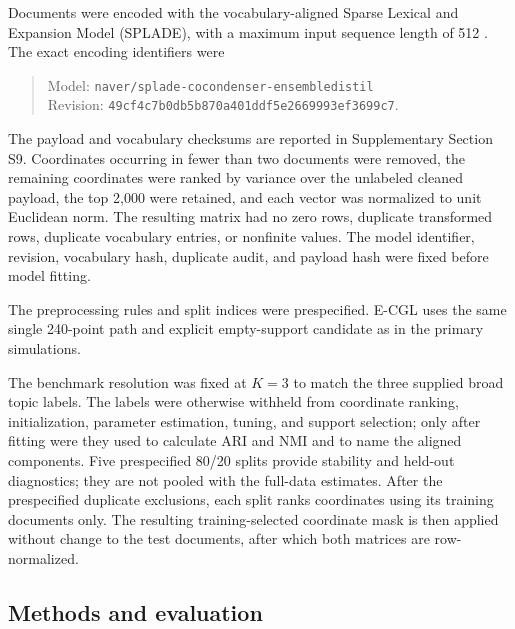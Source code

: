 \documentclass[preprint,12pt,authoryear]{elsarticle}
\begin{document}
Documents were encoded with the vocabulary-aligned Sparse Lexical and
Expansion Model (SPLADE), with a maximum input sequence length of 512
\citep{formal2021splade,formal2022hardnegative}. The exact encoding identifiers
were
\begingroup\small
\begin{quote}\noindent
Model: \texttt{naver/splade-cocondenser-ensembledistil}\\
Revision: \texttt{49cf4c7b0db5b870a401ddf5e2669993ef3699c7}.
\end{quote}
\endgroup
The payload and vocabulary checksums are reported in Supplementary Section
S9. Coordinates occurring in fewer than two documents were removed, the
remaining coordinates were ranked by variance over the unlabeled cleaned
payload, the top 2,000 were retained, and each vector was normalized to unit
Euclidean norm. The resulting matrix had no zero rows, duplicate
transformed rows, duplicate vocabulary entries, or nonfinite values. The
model identifier, revision, vocabulary hash, duplicate audit, and payload hash
were fixed before model fitting.

The preprocessing rules and split indices were prespecified. E-CGL uses the
same single 240-point path and explicit empty-support candidate as in the
primary simulations.

The benchmark resolution was fixed at $K=3$ to match the three supplied broad
topic labels. The labels were otherwise withheld from coordinate ranking,
initialization, parameter estimation, tuning, and support selection; only after
fitting were they used to calculate ARI and NMI and to name the aligned
components.
Five prespecified 80/20 splits provide stability and held-out diagnostics; they
are not pooled with the full-data estimates. After
the prespecified duplicate exclusions, each split ranks coordinates using its
training documents only. The resulting training-selected coordinate mask is
then applied without change to the test documents, after which both matrices
are row-normalized.

\subsection{Methods and evaluation}
\end{document}
